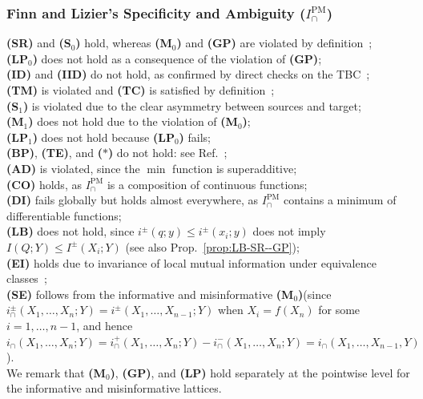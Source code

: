 \documentclass{article}
\newcommand{\ts}[1]{\ensuremath{_{\text{#1}}}}
\newcommand{\Xs}{X_1,\ldots,X_n}
\newcommand{\Xsm}{X_1,\ldots,X_{n-1}}
\newcommand{\SR}{\textbf{(SR)}\xspace} %
\newcommand{\Sz}{\textbf{(S\ts{0})}\xspace} %
\newcommand{\Mz}{\textbf{(M\ts{0})}\xspace} %
\newcommand{\GP}{\textbf{(GP)}\xspace} %
\newcommand{\LPz}{\textbf{(LP\ts{0})}\xspace} %
\newcommand{\ID}{\textbf{(ID)}\xspace} %
\newcommand{\IID}{\textbf{(IID)}\xspace} %
\newcommand{\TM}{\textbf{(TM)}\xspace} %
\newcommand{\TC}{\textbf{(TC)}\xspace} %
\newcommand{\So}{\textbf{(S\ts{1})}\xspace} %
\newcommand{\Mo}{\textbf{(M\ts{1})}\xspace} %
\newcommand{\LPo}{\textbf{(LP\ts{1})}\xspace} %
\newcommand{\BP}{\textbf{(BP)}\xspace} %
\newcommand{\TE}{\textbf{(TE)}\xspace} %
\newcommand{\AST}{\textbf{($\boldsymbol{\ast}$)}\xspace} %
\newcommand{\AD}{\textbf{(AD)}\xspace} %
\newcommand{\CO}{\textbf{(CO)}\xspace} %
\newcommand{\LB}{\textbf{(LB)}\xspace} %
\newcommand{\EI}{\textbf{(EI)}\xspace} %
\newcommand{\SE}{\textbf{(SE)}\xspace} %
\newcommand{\LP}{\textbf{(LP)}\xspace}
\newcommand{\DI}{\textbf{(DI)}\xspace}
\newcommand{\IPM}{\ensuremath{I_\cap^{\text{PM}}}\xspace}
\begin{document}
\subsubsection*{Finn and Lizier's Specificity and Ambiguity ($\IPM$)}
    \SR and \Sz hold, whereas \Mz and \GP are violated by definition~\cite{finn2018pointwise}; \\
    \LPz does not hold as a consequence of the violation of \GP; \\
    \ID and \IID do not hold, as confirmed by direct checks on the TBC~\cite{finn2018pointwise}; \\
    \TM is violated and \TC is satisfied by definition~\cite{finn2018pointwise}; \\
    \So is violated due to the clear asymmetry between sources and target; \\
    \Mo does not hold due to the violation of \Mz; \\
    \LPo does not hold because \LPz fails; \\
    \BP, \TE, and \AST do not hold: see Ref.~\cite{kolchinsky2022novel}; \\
    \AD is violated, since the $\min$ function is superadditive; \\
    \CO holds, as $\IPM$ is a composition of continuous functions; \\
    \DI fails globally but holds almost everywhere, as \IPM contains a minimum of differentiable functions; \\  
    \LB does not hold, since $i^\pm(q;y)\le i^\pm(x_i;y)$ does not imply $I(Q;Y)\le I^\pm(X_i;Y)$ (see also Prop.~\ref{prop:LB-SR--GP}); \\
    \EI holds due to invariance of local mutual information under equivalence classes~\cite{li2011connection}; \\
    \SE follows from the informative and misinformative \Mz (since $i_\cap^\pm(\Xs;Y)=i^\pm(\Xsm;Y)$ when  $X_i=f(X_n)$ for some $i=1,\ldots,n-1$, and hence $i_\cap(\Xs;Y)=i_\cap^+(\Xs;Y)-i_\cap^-(\Xs;Y)=i_\cap(\Xsm,Y)$). \\
    We remark that \Mz, \GP, and \LP hold separately at the pointwise level for the informative and misinformative lattices.
\end{document}
